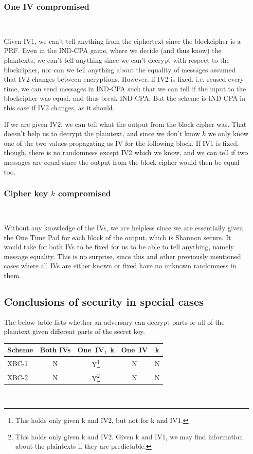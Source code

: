 \documentclass[conference]{IEEEtran}
\begin{document}
\subsubsection{One IV compromised} \
\label{xbc2-one_iv}

Given IV1, we can't tell anything from the ciphertext since the blockcipher is a PRF. Even in the IND-CPA game, where we decide (and thus know) the plaintexts, we can't tell anything since we can't decrypt with respect to the blockcipher, nor can we tell anything about the equality of messages assumed that IV2 changes between encryptions. However, if IV2 is fixed, i.e. reused every time, we can send messages in IND-CPA such that we can tell if the input to the blockcipher was equal, and thus break IND-CPA. But the scheme is IND-CPA in this case if IV2 changes, as it should. \

If we are given IV2, we can tell what the output from the block cipher was. That doesn't help us to decrypt the plaintext, and since we don't know $k$ we only know one of the two values propagating as IV for the following block. If IV1 is fixed, though, there is no randomness except IV2 which we know, and we can tell if two messages are equal since the output from the block cipher would then be equal too.

\subsubsection{Cipher key $k$ compromised} \

Without any knowledge of the IVs, we are helpless since we are essentially given the One Time Pad for each block of the output, which is Shannon secure. It would take for both IVs to be fixed for us to be able to tell anything, namely message equality. This is no surprise, since this and other previously mentioned cases where all IVs are either known or fixed have no unknown randomness in them.

\subsection{Conclusions of security in special cases}

The below table lists whether an adversary can decrypt parts or all of the plaintext given different parts of the secret key. \\

\begin{minipage}{6cm} %
\begin{tabular}{| l | c c c c | }
\hline
  Scheme & Both IVs & One\ IV,\ k & One\ IV & k \\ \hline
  XBC-1 & N & Y\footnote{This holds only given k and IV2, but not for k and IV1.} & N & N \\
  XBC-2 & N & Y\footnote{This holds only given k and IV2. Given k and IV1, we may find information
  about the plaintexts if they are predictable.} & N & N \\
\hline
\end{tabular}
\end{minipage} \\
\end{document}
